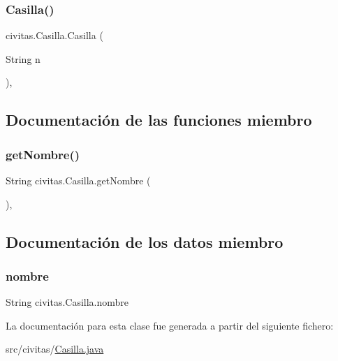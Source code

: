 \subsubsection{\texorpdfstring{Casilla()}{Casilla()}}
{\footnotesize\ttfamily civitas.\+Casilla.\+Casilla (\begin{DoxyParamCaption}\item[{String}]{n }\end{DoxyParamCaption})\hspace{0.3cm}{\ttfamily [inline]}, {\ttfamily [package]}}



\subsection{Documentación de las funciones miembro}
\mbox{\label{classcivitas_1_1Casilla_aeff56538b363f5ca69221cf0b0743d37}} 
\subsubsection{\texorpdfstring{get\+Nombre()}{getNombre()}}
{\footnotesize\ttfamily String civitas.\+Casilla.\+get\+Nombre (\begin{DoxyParamCaption}{ }\end{DoxyParamCaption})\hspace{0.3cm}{\ttfamily [inline]}, {\ttfamily [package]}}



\subsection{Documentación de los datos miembro}
\mbox{\label{classcivitas_1_1Casilla_a0c92d713bf425d120f6952bb5db1f643}} 
\subsubsection{\texorpdfstring{nombre}{nombre}}
{\footnotesize\ttfamily String civitas.\+Casilla.\+nombre\hspace{0.3cm}{\ttfamily [private]}}



La documentación para esta clase fue generada a partir del siguiente fichero\+:\begin{DoxyCompactItemize}
\item 
src/civitas/\hyperlink{Casilla_8java}{Casilla.\+java}\end{DoxyCompactItemize}
